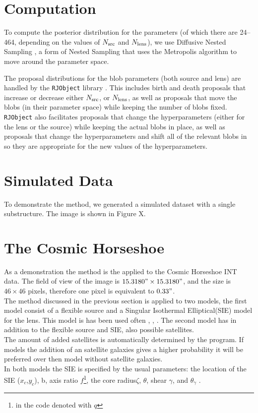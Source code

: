\documentclass[useAMS,usenatbib]{mn2e}
\begin{document}
\section{Computation}
To compute the posterior distribution for the parameters
(of which there are 24--464, depending on the values of $N_{\rm src}$ and
$N_{\rm lens}$), we use Diffusive Nested Sampling \citep{dnest}, a form
of Nested Sampling \citep{skilling} that uses the Metropolis algorithm
to move around the parameter space.

The proposal distributions for the blob parameters (both source and lens) are
handled by the {\tt RJObject} library \citep{rjobject}. This includes
birth and death proposals that increase or decrease either $N_{\rm src}$,
or $N_{\rm lens}$, as well as proposals that move the blobs (in their parameter
space) while keeping the number of blobs fixed. {\tt RJObject} also
facilitates proposals that change the hyperparameters (either for the lens
or the source) while keeping the actual blobs in place, as well as proposals
that change the hyperparameters and shift all of the relevant blobs in
so they are appropriate for the new values of the hyperparameters.

\section{Simulated Data}
To demonstrate the method, we generated a simulated dataset with a single
substructure. The image is shown in Figure X.

\section{The Cosmic Horseshoe}
As a demonstration the method is the applied to the Cosmic Horseshoe INT data. 
The field of view of the image is $15.3180" \times 15.3180"$, and the size is $46 \times 46$ pixels, therefore one pixel is equivalent to $0.33"$. \\
The method discussed  in the previous section is applied to two models, the first model consist of a flexible source and a Singular Isothermal Elliptical(SIE) model for the lens. This model is has been used often  \cite{Dye2008}, \cite{schneider_falcoa_Ehlers_1994},      . 
The second model has in addition to the flexible source and SIE, also possible satellites. \\
The amount of added satellites is automatically determined by the program. If models the addition of an satellite galaxies gives a higher probability it will be preferred over then model without satellite galaxies.  \\
In both models the SIE is specified by the usual parameters: the location of the SIE ($x_c$,$y_c$), b, axis ratio $f$\footnote{in the code denoted with $q$},  the core radius$\zeta$, $\theta$, shear $\gamma$, and $\theta_{\gamma}$ \cite{kormann_schneider_1994}.\\
\end{document}
